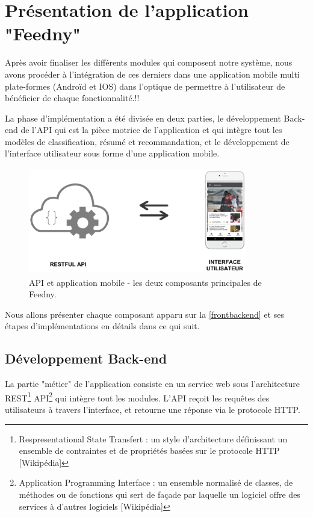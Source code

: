 \section{Présentation de l'application "Feedny"}
Après avoir finaliser les différents modules qui composent notre système, nous avons procéder à l'intégration de ces derniers dans une application mobile multi plate-formes (Androïd et IOS) dans l'optique de permettre à l'utilisateur de bénéficier de chaque fonctionnalité.!!

La phase d'implémentation a été divisée en deux parties, le développement Back-end de l'API qui est la pièce motrice de l'application et qui intègre tout les modèles de classification, résumé et recommandation, et le développement de l'interface utilisateur sous forme d'une application mobile.

\begin{figure}[H]
    \centering
    \includegraphics[height=132pt,width=270pt]{img/chapter4/frontbackend.png}
    \caption{API et application mobile - les deux composants principales de \textquotedbl Feedny\textquotedbl. }
    \label{frontbackend}
\end{figure}

Nous allons présenter chaque composant apparu sur la \autoref{frontbackend} et ses étapes d'implémentations en détails dans ce qui suit.

    \subsection{Développement Back-end}
    La partie "métier" de l'application consiste en un service web sous l'architecture REST\footnote{Respresentational State Transfert : un style d'architecture définissant un ensemble de contraintes et de propriétés basées sur le protocole HTTP [Wikipédia]} API\footnote{Application Programming Interface : un ensemble normalisé de classes, de méthodes ou de fonctions qui sert de façade par laquelle un logiciel offre des services à d'autres logiciels [Wikipédia]} qui intègre tout les modules. L'API reçoit les requêtes des utilisateurs à travers l'interface, et retourne une réponse via le protocole HTTP.

